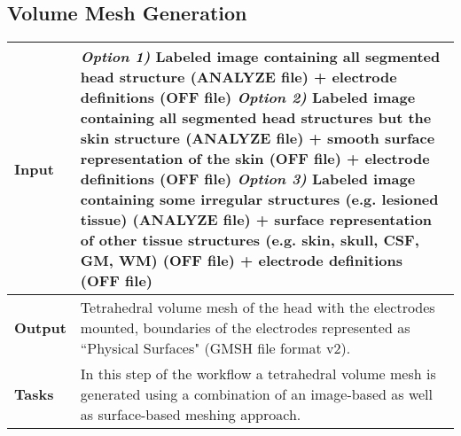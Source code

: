 \subsection{Volume Mesh Generation}
\begin{tabular}{ | p{} || p{} | }
    \hline
    \textbf{Input}  & \emph{Option 1)} Labeled image containing all segmented head structure (ANALYZE file) + 
                      electrode definitions (OFF file) \newline
                      \emph{Option 2)} Labeled image containing all segmented head structures but the skin
                      structure (ANALYZE file) +  smooth surface representation of the skin (OFF file)
                      + electrode definitions (OFF file) 
                      \emph{Option 3)} Labeled image containing some irregular structures (e.g. lesioned tissue) (ANALYZE file) + 
                      surface representation of other tissue structures (e.g. skin, skull, CSF, GM, WM) (OFF file) +
                      electrode definitions (OFF file)\\
    \hline
    \textbf{Output} & Tetrahedral volume mesh of the head with the electrodes mounted, boundaries of the
                      electrodes represented as ``Physical Surfaces" (GMSH file format v2). \\
    \hline
    \textbf{Tasks} & In this step of the workflow a tetrahedral volume mesh is generated using a combination
                     of an image-based as well as surface-based meshing approach.\\
    \hline
\end{tabular}

\hspace{0.5cm}

